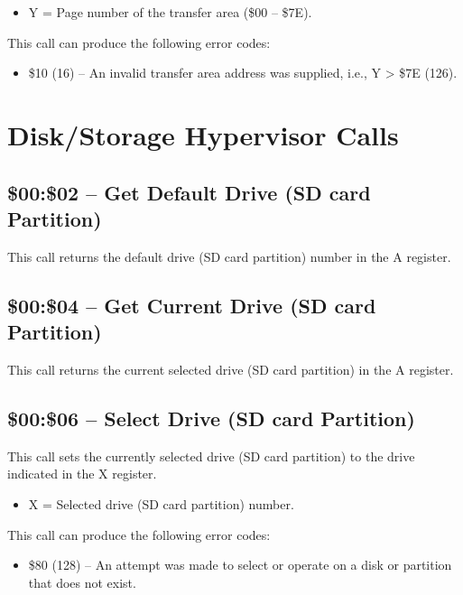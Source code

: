 \begin{itemize}
  \item Y = Page number of the transfer area (\$00 -- \$7E).
\end{itemize}

This call can produce the following error codes:

\begin{itemize}
\item \$10 (16) -- An invalid transfer area address was supplied, i.e., Y > \$7E (126).
\end{itemize}

\section{Disk/Storage Hypervisor Calls}

\subsection{\$00:\$02 -- Get Default Drive (SD card Partition)}

This call returns the default drive (SD card partition) number in the A register.

\subsection{\$00:\$04 -- Get Current Drive (SD card Partition)}

This call returns the current selected drive (SD card partition) in the A register.

\subsection{\$00:\$06 -- Select Drive (SD card Partition)}

This call sets the currently selected drive (SD card partition) to the drive indicated in the X register.

\begin{itemize}
  \item X = Selected drive (SD card partition) number.
\end{itemize}

This call can produce the following error codes:

\begin{itemize}
\item \$80 (128) -- An attempt was made to select or operate on a disk or partition that does not exist.
\end{itemize}

